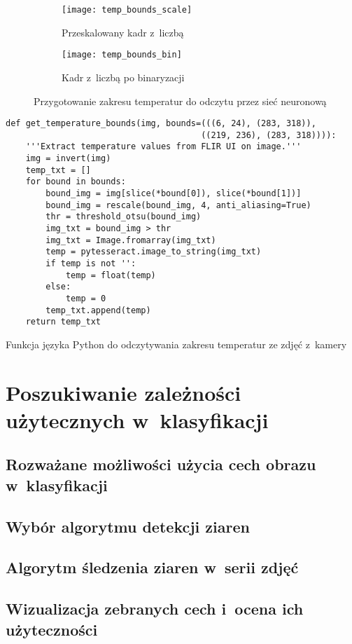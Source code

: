 \begin{figure}[h]
	\centering
	\begin{subfigure}[h]{0.45\textwidth}
		\centering
		\texttt{[image: temp\_bounds\_scale]}
		\caption{Przeskalowany kadr z~liczbą}
		\label{fig:temp_bounds_scale}
	\end{subfigure}
	\quad
	\begin{subfigure}[h]{0.45\textwidth}
		\centering
		\texttt{[image: temp\_bounds\_bin]}
		\caption{Kadr z~liczbą po binaryzacji}
		\label{fig:temp_bounds_bin}
	\end{subfigure}
	
	\caption{Przygotowanie zakresu temperatur do odczytu przez sieć neuronową}
	\label{fig:temp_bounds}
\end{figure}

\begin{listing}[h]
\begin{verbatim}
def get_temperature_bounds(img, bounds=(((6, 24), (283, 318)),
                                       ((219, 236), (283, 318)))):
    '''Extract temperature values from FLIR UI on image.'''
    img = invert(img)
    temp_txt = []
    for bound in bounds:
        bound_img = img[slice(*bound[0]), slice(*bound[1])]
        bound_img = rescale(bound_img, 4, anti_aliasing=True)
        thr = threshold_otsu(bound_img)
        img_txt = bound_img > thr
        img_txt = Image.fromarray(img_txt)
        temp = pytesseract.image_to_string(img_txt)
        if temp is not '': 
            temp = float(temp)
        else:
            temp = 0
        temp_txt.append(temp)
    return temp_txt
\end{verbatim}
\caption{Funkcja języka Python do odczytywania zakresu temperatur ze zdjęć
         z~kamery}
\label{lst:temp_bounds}
\end{listing}


\section{Poszukiwanie zależności użytecznych w~klasyfikacji}

\subsection{Rozważane możliwości użycia cech obrazu w~klasyfikacji}

\subsection{Wybór algorytmu detekcji ziaren}

\subsection{Algorytm śledzenia ziaren w~serii zdjęć}

\subsection{Wizualizacja zebranych cech i~ocena ich użyteczności}

